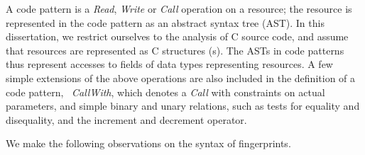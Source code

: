 A code pattern is a \textit{Read}, \textit{Write} or \textit{Call} operation on
a resource; the resource is represented in the code pattern as an abstract
syntax tree (AST). In this dissertation, we restrict ourselves to the analysis
of C source code, and assume that resources are represented as C structures
(s). The ASTs in code patterns thus represent accesses to fields
of data types representing resources.  A few simple extensions of the above
operations are also included in the definition of a code pattern,
\eg~\textit{CallWith}, which denotes a \textit{Call} with constraints on actual
parameters, and simple binary and unary relations, such as tests for equality
and disequality, and the increment and decrement operator.

We make the following observations on the syntax of fingerprints.

